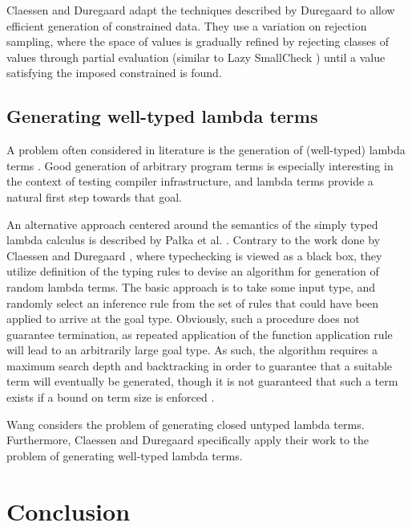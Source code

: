 \documentclass[a4paper,msc,twosized=semi]{uustthesis}
\begin{document}
   Claessen and Duregaard \cite{claessen2015generating} adapt the techniques described by Duregaard \cite{duregaard2013feat} to allow efficient generation of constrained data. They use a variation on rejection sampling, where the space of values is gradually refined by rejecting classes of values through partial evaluation (similar to Lazy SmallCheck \cite{runciman2008smallcheck}) until a value satisfying the imposed constrained is found. 

\subsection{Generating well-typed lambda terms}

  A problem often considered in literature is the generation of (well-typed) lambda 
  terms \cite{palka2011testing, grygiel2013counting, claessen2015generating}. Good 
  generation of arbitrary program terms is especially interesting in the context of 
  testing compiler infrastructure, and lambda terms provide a natural first step 
  towards that goal. 

  An alternative approach centered around the semantics of the simply typed lambda 
  calculus is described by Pa{\l}ka et al. \cite{palka2011testing}. Contrary to the 
  work done by Claessen and Duregaard \cite{claessen2015generating}, where 
  typechecking is viewed as a black box, they utilize definition of the typing rules 
  to devise an algorithm for generation of random lambda terms. The basic approach is 
  to take some input type, and randomly select an inference rule from the set of rules 
  that could have been applied to arrive at the goal type. Obviously, such a procedure 
  does not guarantee termination, as repeated application of the function application 
  rule will lead to an arbitrarily large goal type. As such, the algorithm requires a 
  maximum search depth and backtracking in order to guarantee that a suitable term 
  will eventually be generated, though it is not guaranteed that such a term exists if 
  a bound on term size is enforced \cite{moczurad2000statistical}. 

  Wang \cite{wang2005generating} considers the problem of generating closed untyped 
  lambda terms. Furthermore, Claessen and Duregaard \cite{claessen2015generating} specifically apply their work to the problem of generating well-typed lambda terms. 

\section{Conclusion}
\end{document}
